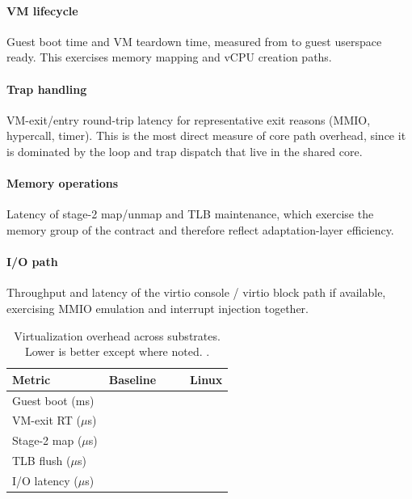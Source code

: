 \paragraph{VM lifecycle}
Guest boot time and VM teardown time, measured from  to
guest userspace ready. This exercises memory mapping and vCPU creation paths.

\paragraph{Trap handling}
VM-exit/entry round-trip latency for representative exit reasons (MMIO,
hypercall, timer). This is the most direct measure of core path overhead, since
it is dominated by the  loop and trap dispatch that live in the
shared core.

\paragraph{Memory operations}
Latency of stage-2 map/unmap and TLB maintenance, which exercise the memory
group of the contract and therefore reflect adaptation-layer efficiency.

\paragraph{I/O path}
Throughput and latency of the virtio console / virtio block path if available,
exercising MMIO emulation and interrupt injection together.

\begin{table}[t]
  \centering
  \caption{Virtualization overhead across substrates. Lower is better except
  where noted. .}
  \label{tab:overhead}
  \begin{tabular}{@{}lcccc@{}}
    \toprule
    \textbf{Metric} & \textbf{Baseline} & \textbf{\arceos{}} &
      \textbf{\asterinas{}} & \textbf{Linux} \\
    \midrule
    Guest boot (ms)     & \fillme{} & \fillme{} & \fillme{} & \fillme{} \\
    VM-exit RT ($\mu$s) & \fillme{} & \fillme{} & \fillme{} & \fillme{} \\
    Stage-2 map ($\mu$s)& \fillme{} & \fillme{} & \fillme{} & \fillme{} \\
    TLB flush ($\mu$s)  & \fillme{} & \fillme{} & \fillme{} & \fillme{} \\
    I/O latency ($\mu$s)& \fillme{} & \fillme{} & \fillme{} & \fillme{} \\
    \bottomrule
  \end{tabular}
\end{table}

